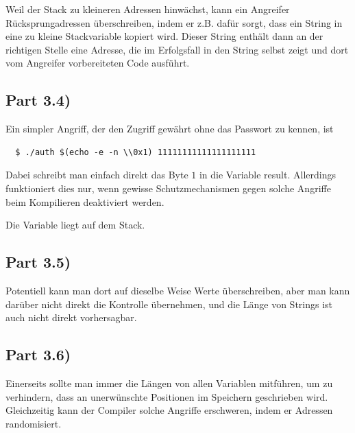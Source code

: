\documentclass[10pt,a4paper]{article}
\begin{document}
Weil der Stack zu kleineren Adressen hinwächst, kann ein Angreifer Rücksprungadressen überschreiben, indem er z.B. dafür sorgt, dass ein String in eine zu kleine Stackvariable kopiert wird.
Dieser String enthält dann an der richtigen Stelle eine Adresse, die im Erfolgsfall in den String selbst zeigt und dort vom Angreifer vorbereiteten Code ausführt.

\subsection*{Part 3.4)}

Ein simpler Angriff, der den Zugriff gewährt ohne das Passwort zu kennen, ist
\begin{verbatim}
  $ ./auth $(echo -e -n \\0x1) 11111111111111111111
\end{verbatim}
Dabei schreibt man einfach direkt das Byte $1$ in die Variable result.
Allerdings funktioniert dies nur, wenn gewisse Schutzmechanismen gegen solche Angriffe beim Kompilieren deaktiviert werden.

Die Variable liegt auf dem Stack.

\subsection*{Part 3.5)}

Potentiell kann man dort auf dieselbe Weise Werte überschreiben, aber man kann darüber nicht direkt die Kontrolle übernehmen, und die Länge von Strings ist auch nicht direkt vorhersagbar.

\subsection*{Part 3.6)}

Einerseits sollte man immer die Längen von allen Variablen mitführen, um zu verhindern, dass an unerwünschte Positionen im Speichern geschrieben wird.
Gleichzeitig kann der Compiler solche Angriffe erschweren, indem er Adressen randomisiert.
\end{document}
